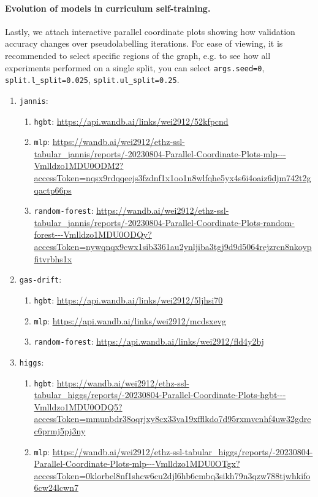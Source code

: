 \documentclass{article}
\begin{document}
\paragraph{Evolution of models in curriculum self-training.}
Lastly, we attach interactive parallel coordinate plots showing how validation accuracy
changes over pseudolabelling iterations.
For ease of viewing, it is recommended to select specific regions of the graph, e.g. to
see how all experiments performed on a single split, you can select
\texttt{args.seed=0}, \texttt{split.l\_split=0.025}, \texttt{split.ul\_split=0.25}.
{
  \small
  \begin{enumerate}
    \item \texttt{jannis}: \begin{enumerate}
      \item \texttt{hgbt}: \url{https://api.wandb.ai/links/wei2912/52kfpcnd}
      \item \texttt{mlp}: \url{https://wandb.ai/wei2912/ethz-ssl-tabular_jannis/reports/-20230804-Parallel-Coordinate-Plots-mlp---Vmlldzo1MDU0ODM2?accessToken=nqsx9rdqqeejs3fzdnf1x1oo1n8wlfqhe5yx4s6i4oaiz6djm742t2gqactp66ps}
      \item \texttt{random-forest}: \url{https://wandb.ai/wei2912/ethz-ssl-tabular_jannis/reports/-20230804-Parallel-Coordinate-Plots-random-forest---Vmlldzo1MDU0ODQy?accessToken=nywqnqx9cwx1sib3361au2ynljiba3tgj9d9d5064rejzrcn8nkoypfitvrbhs1x}
    \end{enumerate}
    \item \texttt{gas-drift}: \begin{enumerate}
      \item \texttt{hgbt}: \url{https://api.wandb.ai/links/wei2912/5ljhsi70}
      \item \texttt{mlp}: \url{https://api.wandb.ai/links/wei2912/mcdsxevg}
      \item \texttt{random-forest}: \url{https://api.wandb.ai/links/wei2912/fld4y2bj}
    \end{enumerate}
    \item \texttt{higgs}: \begin{enumerate}
      \item \texttt{hgbt}: \url{https://wandb.ai/wei2912/ethz-ssl-tabular_higgs/reports/-20230804-Parallel-Coordinate-Plots-hgbt---Vmlldzo1MDU0ODQ5?accessToken=mmunbdr38oqrjxy8cx33va19xfflkdo7d95rxmvcnhf4uw32gdrec6prmj5pj3ny}
      \item \texttt{mlp}: \url{https://wandb.ai/wei2912/ethz-ssl-tabular_higgs/reports/-20230804-Parallel-Coordinate-Plots-mlp---Vmlldzo1MDU0OTgx?accessToken=0klorbel8nf1shcw6cu2djl6hb6cmbq3sikh79n3qzw788tjwhkifo6cw24lcwn7}

\end{enumerate}
\end{enumerate}}
\end{document}
